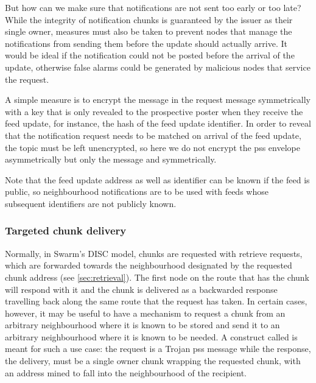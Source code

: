 But how can we make sure that notifications are not sent too early or too late? While the integrity of notification chunks is guaranteed by the issuer as their single owner, measures must also be taken to prevent nodes that manage the notifications from sending them before the update should actually arrive. It would be ideal if the notification could not be posted before the arrival of the update, otherwise false alarms could be generated by malicious nodes that service the request.

A simple measure is to encrypt the message in the request  message symmetrically with a key that is only revealed to the prospective poster when they receive the feed update, for instance, the hash of the feed update identifier.
In order to reveal that the notification request needs to be matched on arrival of the feed update, the topic must be left unencrypted, so here we do not encrypt the pss envelope asymmetrically but only the message and symmetrically.

Note that the feed update address as well as identifier can be known if the feed is public, so neighbourhood notifications are to be used with feeds whose subsequent identifiers are not publicly known.

\subsubsection{Targeted chunk delivery}

Normally, in Swarm's DISC model, chunks are requested with retrieve requests, which are forwarded towards the neighbourhood designated by the requested chunk address (see \ref{sec:retrieval}). The first node on the route that has the chunk will respond with it and the chunk is delivered as a backwarded response travelling back along the same route that the request has taken. In certain cases, however, it may be useful to have a mechanism to request a chunk from an arbitrary neighbourhood where it is known to be stored and send it to an arbitrary neighbourhood where it is known to be needed. A construct called  is meant for such a use case: the request is a Trojan pss message while the response, the delivery, must be a single owner chunk wrapping the requested chunk, with an address mined to fall into the neighbourhood of the recipient.  


